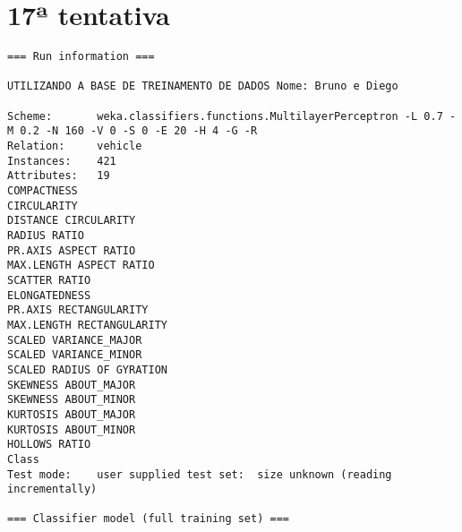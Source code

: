 \documentclass[
	article,			%
	11pt,				%
	oneside,			%
	a4paper,			%
	english,			%
	brazil,				%
	sumario=tradicional
	]{abntex2}
\begin{document}
\section{17ª tentativa}

\begin{lstlisting}
=== Run information ===

UTILIZANDO A BASE DE TREINAMENTO DE DADOS Nome: Bruno e Diego

Scheme:       weka.classifiers.functions.MultilayerPerceptron -L 0.7 -M 0.2 -N 160 -V 0 -S 0 -E 20 -H 4 -G -R
Relation:     vehicle
Instances:    421
Attributes:   19
COMPACTNESS
CIRCULARITY
DISTANCE CIRCULARITY
RADIUS RATIO
PR.AXIS ASPECT RATIO
MAX.LENGTH ASPECT RATIO
SCATTER RATIO
ELONGATEDNESS
PR.AXIS RECTANGULARITY
MAX.LENGTH RECTANGULARITY
SCALED VARIANCE_MAJOR
SCALED VARIANCE_MINOR
SCALED RADIUS OF GYRATION
SKEWNESS ABOUT_MAJOR
SKEWNESS ABOUT_MINOR
KURTOSIS ABOUT_MAJOR
KURTOSIS ABOUT_MINOR
HOLLOWS RATIO
Class
Test mode:    user supplied test set:  size unknown (reading incrementally)

=== Classifier model (full training set) ===


\end{lstlisting}
\end{document}
